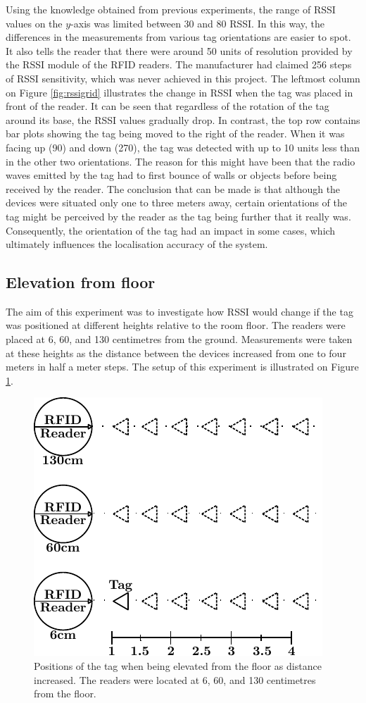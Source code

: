 Using the knowledge obtained from previous experiments, the range of RSSI values on the $y$-axis was limited between 30 and 80 RSSI. In this way, the differences in the measurements from various tag orientations are easier to spot. It also tells the reader that there were around 50 units of resolution provided by the RSSI module of the RFID readers. The manufacturer had claimed 256 steps of RSSI sensitivity, which was never achieved in this project. The leftmost column on Figure \ref{fig:rssigrid} illustrates the change in RSSI when the tag was placed in front of the reader. It can be seen that regardless of the rotation of the tag around its base, the RSSI values gradually drop. In contrast, the top row contains bar plots showing the tag being moved to the right of the reader. When it was facing up (90\textdegree) and down (270\textdegree), the tag was detected with up to 10 units less than in the other two orientations. The reason for this might have been that the radio waves emitted by the tag had to first bounce of walls or objects before being received by the reader. The conclusion that can be made is that although the devices were situated only one to three meters away, certain orientations of the tag might be perceived by the reader as the tag being further that it really was. Consequently, the orientation of the tag had an impact in some cases, which ultimately influences the localisation accuracy of the system.


\subsection{Elevation from floor}

The aim of this experiment was to investigate how RSSI would change if the tag was positioned at different heights relative to the room floor. The readers were placed at 6, 60, and 130 centimetres from the ground. Measurements were taken at these heights as the distance between the devices increased from one to four meters in half a meter steps. The setup of this experiment is illustrated on Figure \ref{fig:ele}.
\begin{figure}[h]
	\begin{center}
		\includegraphics[width=.4\textwidth]{figures/exp/elevation}
		\caption{Positions of the tag when being elevated from the floor as distance increased. The readers were located at 6, 60, and 130 centimetres from the floor.}
		\label{fig:ele}
	\end{center}
\end{figure}

